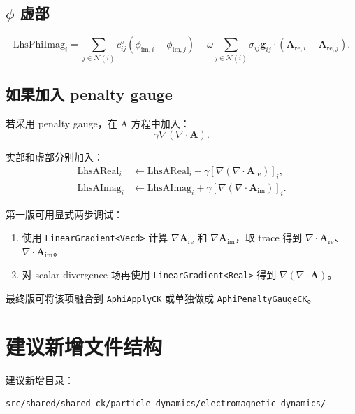 \documentclass[UTF8,a4paper,11pt]{ctexart}
\newcommand{\code}[1]{\texttt{#1}}
\newcommand{\Are}{\bm A_{\mathrm{re}}}
\newcommand{\Aim}{\bm A_{\mathrm{im}}}
\newcommand{\Nset}{\mathcal N}
\begin{document}
\subsection{$\phi$ 虚部}
\begin{equation}
\mathrm{LhsPhiImag}_i
=
\sum_{j\in\Nset(i)}c^\sigma_{ij}
\left(\phi_{\mathrm{im},i}-\phi_{\mathrm{im},j}\right)
-
\omega
\sum_{j\in\Nset(i)}\sigma_{ij}\bm g_{ij}\cdot
\left(\bm A_{\mathrm{re},i}-\bm A_{\mathrm{re},j}\right).
\end{equation}

\subsection{如果加入 penalty gauge}

若采用 penalty gauge，在 A 方程中加入：
\begin{equation}
\gamma\nabla(\nabla\cdot\bm A).
\end{equation}

实部和虚部分别加入：
\begin{align}
\mathrm{LhsAReal}_i &\leftarrow \mathrm{LhsAReal}_i+
\gamma\left[\nabla(\nabla\cdot\Are)\right]_i,\\
\mathrm{LhsAImag}_i &\leftarrow \mathrm{LhsAImag}_i+
\gamma\left[\nabla(\nabla\cdot\Aim)\right]_i.
\end{align}

第一版可用显式两步调试：
\begin{enumerate}
  \item 使用 \code{LinearGradient<Vecd>} 计算 $\nabla\Are$ 和 $\nabla\Aim$，取 trace 得到 $\nabla\cdot\Are$、$\nabla\cdot\Aim$。
  \item 对 scalar divergence 场再使用 \code{LinearGradient<Real>} 得到 $\nabla(\nabla\cdot\bm A)$。
\end{enumerate}

最终版可将该项融合到 \code{AphiApplyCK} 或单独做成 \code{AphiPenaltyGaugeCK}。

\section{建议新增文件结构}

建议新增目录：
\begin{lstlisting}
src/shared/shared_ck/particle_dynamics/electromagnetic_dynamics/
\end{lstlisting}
\end{document}
